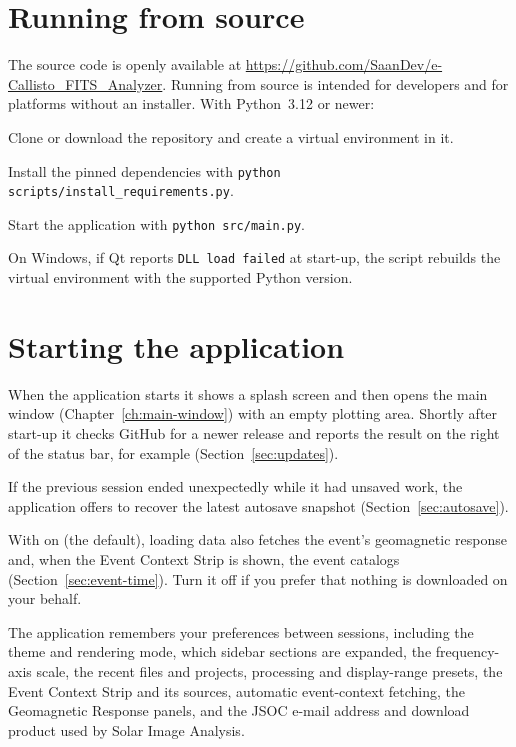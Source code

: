 \section{Running from source}
\label{sec:from-source}

The source code is openly available at
\url{https://github.com/SaanDev/e-Callisto_FITS_Analyzer}. Running from source is intended
for developers and for platforms without an installer. With Python~3.12 or newer:
\begin{steps}
  \item Clone or download the repository and create a virtual environment in it.
  \item Install the pinned dependencies with \texttt{python scripts/install\_requirements.py}.
  \item Start the application with \texttt{python src/main.py}.
\end{steps}
On Windows, if Qt reports \texttt{DLL load failed} at start-up, the script
 rebuilds the virtual environment with the
supported Python version.

\section{Starting the application}
\label{sec:first-launch}

When the application starts it shows a splash screen and then opens the main window
(Chapter~\ref{ch:main-window}) with an empty plotting area. Shortly after start-up it
checks GitHub for a newer release and reports the result on the right of the status bar,
for example  (Section~\ref{sec:updates}).

If the previous session ended unexpectedly while it had unsaved work, the application
offers to recover the latest autosave snapshot (Section~\ref{sec:autosave}).

With  on (the default), loading data
also fetches the event's geomagnetic response and, when the Event Context Strip is shown, the
event catalogs (Section~\ref{sec:event-time}). Turn it off if you prefer that nothing is
downloaded on your behalf.

The application remembers your preferences between sessions, including the theme and
rendering mode, which sidebar sections are expanded, the frequency-axis scale, the recent
files and projects, processing and display-range presets, the Event Context Strip and its
sources, automatic event-context fetching, the Geomagnetic Response panels, and the JSOC
e-mail address and download product used by Solar Image Analysis.


